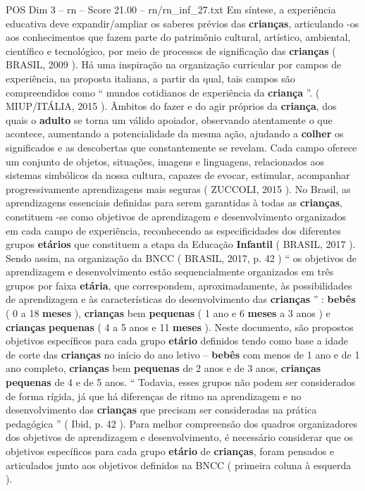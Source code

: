 \begin{textsample}{POS Dim 3 – rn – Score 21.00 – rn/rn\_inf\_27.txt}
Em síntese, a experiência educativa deve expandir/ampliar os saberes prévios das \textbf{crianças}, articulando -os aos conhecimentos que fazem parte do patrimônio cultural, artístico, ambiental, científico e tecnológico, por meio de processos de significação das \textbf{crianças} ( BRASIL, 2009 ).
Há uma inspiração na organização curricular por campos de experiência, na proposta italiana, a partir da qual, tais campos são compreendidos como “ mundos cotidianos de experiência da \textbf{criança} ”. ( MIUP/ITÁLIA, 2015 ).
Âmbitos do fazer e do agir próprios da \textbf{criança}, dos quais o \textbf{adulto} se torna um válido apoiador, observando atentamente o que acontece, aumentando a potencialidade da mesma ação, ajudando a \textbf{colher} os significados e as descobertas que constantemente se revelam.
Cada campo oferece um conjunto de objetos, situações, imagens e linguagens, relacionados aos sistemas simbólicos da nossa cultura, capazes de evocar, estimular, acompanhar progressivamente aprendizagens mais seguras ( ZUCCOLI, 2015 ).
No Brasil, as aprendizagens essenciais definidas para serem garantidas à todas as \textbf{crianças}, constituem -se como objetivos de aprendizagem e desenvolvimento organizados em cada campo de experiência, reconhecendo as especificidades dos diferentes grupos \textbf{etários} que constituem a etapa da Educação \textbf{Infantil} ( BRASIL, 2017 ).
Sendo assim, na organização da BNCC ( BRASIL, 2017, p. 42 ) “ os objetivos de aprendizagem e desenvolvimento estão sequencialmente organizados em três grupos por faixa \textbf{etária}, que correspondem, aproximadamente, às possibilidades de aprendizagem e às características do desenvolvimento das \textbf{crianças} ” : \textbf{bebês} ( 0 a 18 \textbf{meses} ), \textbf{crianças} bem \textbf{pequenas} ( 1 ano e 6 \textbf{meses} a 3 anos ) e \textbf{crianças} \textbf{pequenas} ( 4 a 5 anos e 11 \textbf{meses} ).
Neste documento, são propostos objetivos específicos para cada grupo \textbf{etário} definidos tendo como base a idade de corte das \textbf{crianças} no início do ano letivo – \textbf{bebês} com menos de 1 ano e de 1 ano completo, \textbf{crianças} bem \textbf{pequenas} de 2 anos e de 3 anos, \textbf{crianças} \textbf{pequenas} de 4 e de 5 anos. “ Todavia, esses grupos não podem ser considerados de forma rígida, já que há diferenças de ritmo na aprendizagem e no desenvolvimento das \textbf{crianças} que precisam ser consideradas na prática pedagógica ” ( Ibid, p. 42 ).
Para melhor compreensão dos quadros organizadores dos objetivos de aprendizagem e desenvolvimento, é necessário considerar que os objetivos específicos para cada grupo \textbf{etário} de \textbf{crianças}, foram pensados e articulados junto aos objetivos definidos na BNCC ( primeira coluna à esquerda ).

\end{textsample}
